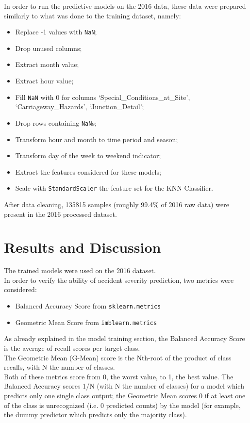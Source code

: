 \documentclass[11pt]{article}
\begin{document}
In order to run the predictive models on the 2016 data, these data were prepared similarly to what was done to the training dataset, namely:
\begin{itemize}
\item Replace -1 values with \texttt{NaN};
\item Drop unused columns;
\item Extract month value;
\item Extract hour value;
\item Fill \texttt{NaN} with 0 for columns `Special\_Conditions\_at\_Site', `Carriageway\_Hazards', `Junction\_Detail';
\item Drop rows containing \texttt{NaN}s;
\item Transform hour and month to time period and season;
\item Transform day of the week to weekend indicator;
\item Extract the features considered for these models;
\item Scale with \texttt{StandardScaler} the feature set for the KNN Classifier.
\end{itemize}

After data cleaning, 135815 samples (roughly 99.4\% of 2016 raw data) were present in the 2016 processed dataset.

\section{Results and Discussion}

The trained models were used on the 2016 dataset.\\
In order to verify the ability of accident severity prediction, two metrics were considered:
\begin{itemize}
\item Balanced Accuracy Score from \texttt{sklearn.metrics}
\item Geometric Mean Score from \texttt{imblearn.metrics}
\end{itemize}
As already explained in the model training section, the Balanced Accuracy Score is the average of recall scores per target class.\\
The Geometric Mean (G-Mean) score is the Nth-root of the product of class recalls, with N the number of classes.\\
Both of these metrics score from 0, the worst value, to 1, the best value. The Balanced Accuracy scores 1/N (with N the number of classes) for a model which predicts only one single class output; the Geometric Mean scores 0 if at least one of the class is unrecognized (i.e. 0 predicted counts) by the model (for example, the dummy predictor which predicts only the majority class).
\end{document}
